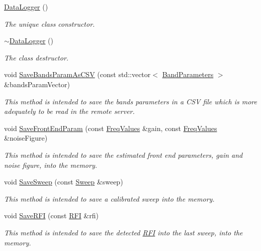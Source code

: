 \begin{DoxyCompactItemize}
\item 
\hyperlink{classDataLogger_a7abebacd4747644d22982f9676466bad}{Data\+Logger} ()
\begin{DoxyCompactList}\small\item\em The unique class constructor. \end{DoxyCompactList}\item 
\mbox{\label{classDataLogger_a9aaff109f3e7749a0a0a0313655da50a}} 
\hyperlink{classDataLogger_a9aaff109f3e7749a0a0a0313655da50a}{$\sim$\+Data\+Logger} ()
\begin{DoxyCompactList}\small\item\em The class destructor. \end{DoxyCompactList}\item 
void \hyperlink{classDataLogger_a2ffe9fb45883c2880e1c45a4406fc22b}{Save\+Bands\+Param\+As\+C\+SV} (const std\+::vector$<$ \hyperlink{structBandParameters}{Band\+Parameters} $>$ \&bands\+Param\+Vector)
\begin{DoxyCompactList}\small\item\em This method is intended to save the bands parameters in a C\+SV file which is more adequately to be read in the remote server. \end{DoxyCompactList}\item 
void \hyperlink{classDataLogger_a058ed66d04269e7d37501ecfe775c067}{Save\+Front\+End\+Param} (const \hyperlink{structFreqValues}{Freq\+Values} \&gain, const \hyperlink{structFreqValues}{Freq\+Values} \&noise\+Figure)
\begin{DoxyCompactList}\small\item\em This method is intended to save the estimated front end parameters, gain and noise figure, into the memory. \end{DoxyCompactList}\item 
void \hyperlink{classDataLogger_ab2063fcd87971520a5bfa5aef6d73fea}{Save\+Sweep} (const \hyperlink{structSweep}{Sweep} \&sweep)
\begin{DoxyCompactList}\small\item\em This method is intended to save a calibrated sweep into the memory. \end{DoxyCompactList}\item 
void \hyperlink{classDataLogger_a0c772c3529adc3759ba0e1e596500f65}{Save\+R\+FI} (const \hyperlink{structRFI}{R\+FI} \&rfi)
\begin{DoxyCompactList}\small\item\em This method is intended to save the detected \hyperlink{structRFI}{R\+FI} into the last sweep, into the memory. \end{DoxyCompactList}\item 

\end{DoxyCompactItemize}

